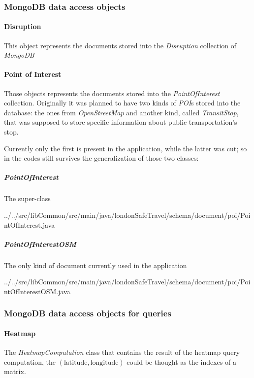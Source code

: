 \subsubsection{MongoDB data access objects}

\paragraph{Disruption}
This object represents the documents stored into the \textit{Disruption} 
collection of \textit{MongoDB}



\paragraph{Point of Interest}
Those objects represents the documents stored into the \textit{PointOfInterest} 
collection. Originally it was planned to have two kinds of \textit{POI}s stored 
into the database: the ones from \textit{OpenStreetMap} and another kind, 
called \textit{TransitStop}, that was supposed to store specific information 
about public transportation's stop.

Currently only the first is present in the application, while the latter was 
cut; so in the codes still survives the generalization of those two classes:

\subparagraph{PointOfInterest}
The super-class


{../../src/libCommon/src/main/java/londonSafeTravel/schema/document/poi/PointOfInterest.java}

\subparagraph{PointOfInterestOSM}
The only kind of document currently used in the application


{../../src/libCommon/src/main/java/londonSafeTravel/schema/document/poi/PointOfInterestOSM.java}

\subsubsection{MongoDB data access objects for queries}

\paragraph{Heatmap}
The \textit{HeatmapComputation} class that contains the result of the heatmap 
query computation, the $(\text{latitude}, \text{longitude})$ could be thought 
as the indexes of a matrix.

